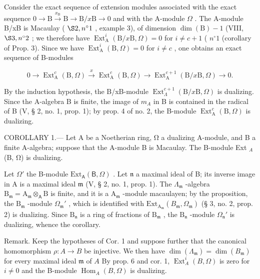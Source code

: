 Consider the exact sequence of extension modules associated with the exact sequence \(0 \to \mathrm{B} \xrightarrow{x_{\mathrm{B}}} \mathrm{B} \longrightarrow \mathrm{B}/x\mathrm{B} \to 0\) and with the A-module \(\Omega\) . The A-module B/xB is Macaulay ( \(\S 2, n^{\circ} 1\) , example 3), of dimension \(\dim(\mathrm{B}) - 1\) (VIII, \(\S 3, n^{\circ} 2\) ; we therefore have \(\operatorname{Ext}_{\mathrm{A}}^{i}(\mathrm{B}/x\mathrm{B}, \Omega) = 0\) for \(i \neq c + 1\) ( \(n^{\circ} 1\) (corollary of Prop. 3). Since we have \(\operatorname{Ext}_{\mathrm{A}}^{i}(\mathrm{B}, \Omega) = 0\) for \(i \neq c\) , one obtains an exact sequence of B-modules

\[
0 \rightarrow \operatorname{Ext} _ {\mathrm{A}} ^ {c} (\mathrm{B}, \Omega) \xrightarrow {x} \operatorname{Ext} _ {\mathrm{A}} ^ {c} (\mathrm{B}, \Omega) \longrightarrow \operatorname{Ext} _ {\mathrm{A}} ^ {c + 1} (\mathrm{B} / x \mathrm{B}, \Omega) \rightarrow 0.
\]

By the induction hypothesis, the B/xB-module \(\operatorname{Ext}_{\Lambda}^{c+1}(\mathrm{B}/x\mathrm{B},\Omega)\) is dualizing. Since the A-algebra B is finite, the image of \(m_{A}\) in B is contained in the radical of B (V, § 2, no. 1, prop. 1); by prop. 4 of no. 2, the B-module \(\operatorname{Ext}_{\mathrm{A}}^{c}(\mathrm{B},\Omega)\) is dualizing.

COROLLARY 1.--- Let A be a Noetherian ring, Ω a dualizing A-module, and B a finite A-algebra; suppose that the A-module B is Macaulay. The B-module Ext \(_{A}\) (B, Ω) is dualizing.

Let \(\Omega'\) the B-module \(\mathrm{Ext}_{\mathsf{A}}(\mathsf{B},\Omega)\) . Let \(\mathfrak{n}\) a maximal ideal of B; its inverse image in A is a maximal ideal \(\mathfrak{m}\) (V, § 2, no. 1, prop. 1). The \(\Lambda_{\mathfrak{m}}\) -algebra \(\mathrm{B}_{\mathfrak{m}} = \mathrm{A}_{\mathfrak{m}} \otimes_{\mathsf{A}} \mathrm{B}\) is finite, and it is a \(\mathrm{A}_{\mathfrak{m}}\) -module macaulayen; by the proposition, the \(\mathrm{B}_{\mathfrak{m}}\) -module \(\Omega_{\mathfrak{m}}'\) , which is identified with \(\mathrm{Ext}_{\mathrm{A}_{\mathfrak{m}}}(B_{\mathfrak{m}},\Omega_{\mathfrak{m}})\) (§ 3, no. 2, prop. 2) is dualizing. Since \(\mathrm{B}_{\mathfrak{n}}\) is a ring of fractions of \(\mathrm{B}_{\mathfrak{m}}\) , the \(\mathrm{B}_{\mathfrak{n}}\) -module \(\Omega_{\mathfrak{n}}'\) is dualizing, whence the corollary.

Remark. Keep the hypotheses of Cor. 1 and suppose further that the canonical homomorphism \(\rho : A \to B\) be injective. We then have \(\dim(\Lambda_{\mathfrak{m}}) = \dim(B_{\mathfrak{m}})\) for every maximal ideal \(\mathfrak{m}\) of \(A\) By prop. 6 and cor. 1, \(\operatorname{Ext}_{A}^{i}(B, \Omega)\) is zero for \(i \neq 0\) and the B-module \(\operatorname{Hom}_{A}(B, \Omega)\) is dualizing.

